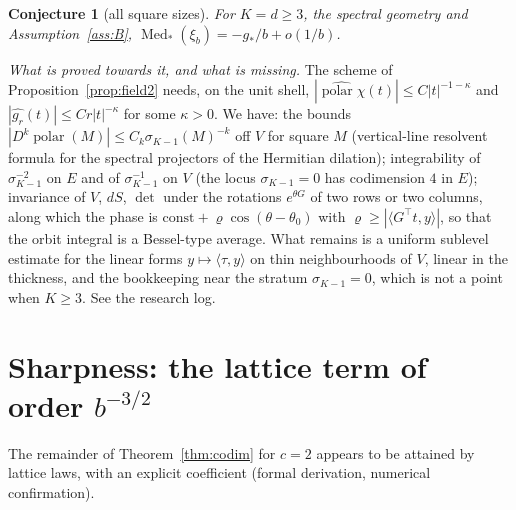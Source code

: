 \documentclass[10pt]{article}
\newtheorem{conjecture}[theorem]{Conjecture}
\theoremstyle{definition}
\theoremstyle{remark}
\newcommand{\inner}[2]{\langle #1, #2\rangle}
\newcommand{\polar}{\operatorname{polar}}
\newcommand{\Med}{\operatorname{Med}}
\begin{document}
\begin{conjecture}[all square sizes]\label{conj:square}
For $K=d\ge3$, the spectral geometry and Assumption~\ref{ass:B}, $\Med_\ast(\xi_b)=-g_\ast/b+o(1/b)$.
\end{conjecture}
\noindent\emph{What is proved towards it, and what is missing.} The scheme of Proposition~\ref{prop:field2} needs, on
the unit shell, $|\widehat{\polar\chi}(t)|\le C|t|^{-1-\kappa}$ and $|\widehat{g_r}(t)|\le Cr|t|^{-\kappa}$ for some
$\kappa>0$. We have: the bounds $|D^k\polar(M)|\le C_k\sigma_{K-1}(M)^{-k}$ off $V$ for square $M$ (vertical-line
resolvent formula for the spectral projectors of the Hermitian dilation); integrability of $\sigma_{K-1}^{-2}$ on $E$
and of $\sigma_{K-1}^{-1}$ on $V$ (the locus $\sigma_{K-1}=0$ has codimension $4$ in $E$); invariance of $V$, $dS$,
$\det$ under the rotations $e^{\theta G}$ of two rows or two columns, along which the phase is
$\mathrm{const}+\varrho\cos(\theta-\theta_0)$ with $\varrho\ge|\inner{G^\top t}{y}|$, so that the orbit integral is a
Bessel-type average. What remains is a uniform sublevel estimate for the linear forms $y\mapsto\inner\tau y$ on thin
neighbourhoods of $V$, linear in the thickness, and the bookkeeping near the stratum $\sigma_{K-1}=0$, which is not a
point when $K\ge3$. See the research log.

\section{Sharpness: the lattice term of order $b^{-3/2}$}\label{sec:sharp}

The remainder of Theorem~\ref{thm:codim} for $c=2$ appears to be attained by lattice laws, with an explicit coefficient (formal derivation, numerical confirmation).
\end{document}
